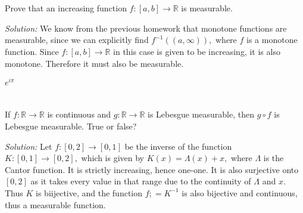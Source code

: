 \documentclass{article}
\begin{document}
\section{} %
\section{} %
\section{} %
Prove that an increasing function $f: [a,b] \rightarrow \mathbb{R}$ is measurable.

\emph{Solution:} We know from the previous homework that monotone functions are measurable, since we can explicitly find $f^{-1}((a,\infty)),$ where $f$ is 
a monotone function. Since $f:[a,b] \rightarrow \mathbb{R}$ in this case is given to be increasing, it is also monotone. Therefore it must also be measurable.

$e^{i \pi}$
\section{} %
\section{} %
If $f: \mathbb{R} \rightarrow \mathbb{R}$ is continuous and $g: \mathbb{R} \rightarrow \mathbb{R}$ is Lebesgue measurable,
then $g \circ f$ is Lebesgue measurable. True or false?

\emph{Solution:} Let $f: [0,2] \rightarrow [0,1]$ be the inverse of the function $K: [0,1]\rightarrow [0,2],$ which is given by $K(x)=\Lambda(x)+x,$ where $\Lambda$ is the Cantor function.
It is strictly increasing, hence one-one. It is also surjective onto $[0,2]$ as it takes every value in that range due to the continuity of $\Lambda$ and $x.$ Thus $K$ is biijective, and the function 
$f;=K^{-1}$ is also bijective and continuous, thus a measurable function.
\section{} %
 
\end{document}
